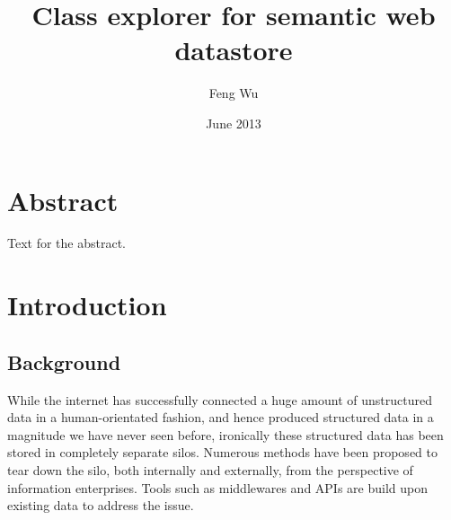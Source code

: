 \documentclass[12pt]{cls}
\title{Class explorer for semantic web datastore}
\author{Feng Wu}
\date{June 2013}
\begin{document}
\muntitlepage

\setcounter{secnumdepth}{3} \setcounter{tocdepth}{3}

 \setcounter{page}{1}

\doublespacing
\setlength{\topmargin}{-.5in}

\chapter*{Abstract}
Text for the abstract.

\renewcommand{\contentsname}{Table of Contents}
\tableofcontents{}
\listoftables{}
\listoffigures{}

\doublespacing
\clearpage



\chapter{Introduction}
\setcounter{secnumdepth}{3} 
\setcounter{page}{1} \pagestyle{myheadings}
\markboth{}{}\markright{} \rhead{\thepage} \setcounter{page}{1}
\pagestyle{myheadings}  \rhead{\thepage}
\setcounter{page}{1}

\section{Background}

While the internet has successfully connected a huge amount of unstructured data in a human-orientated fashion, and hence produced structured data in a magnitude we have never seen before, ironically these structured data has been stored in completely separate silos. Numerous methods have been proposed to tear down the silo, both internally and externally, from the perspective of information enterprises. Tools such as middlewares and APIs are build upon existing data to address the issue.
\end{document}
